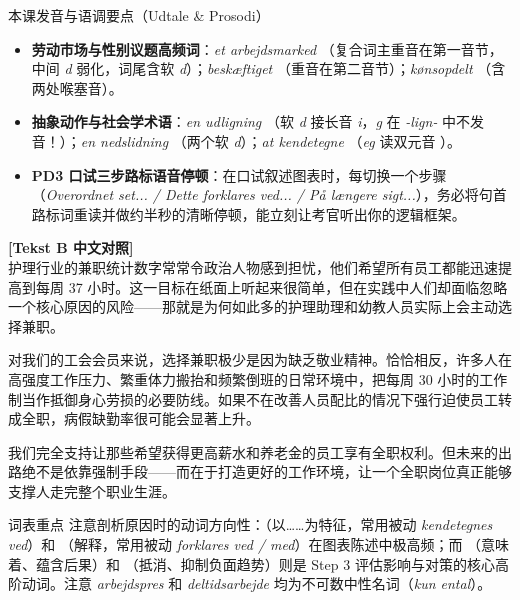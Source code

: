 \begin{tipbox}{本课发音与语调要点（Udtale \& Prosodi）}
\begin{itemize}
  \item \textbf{劳动市场与性别议题高频词}：\textit{et arbejdsmarked} （复合词主重音在第一音节，中间 \textit{d} 弱化，词尾含软 \textit{d}）；\textit{beskæftiget} （重音在第二音节）；\textit{kønsopdelt} （含两处喉塞音）。
  \item \textbf{抽象动作与社会学术语}：\textit{en udligning} （软 \textit{d} 接长音 \textit{i}，\textit{g} 在 \textit{-lign-} 中不发音！）；\textit{en nedslidning} （两个软 \textit{d}）；\textit{at kendetegne} （\textit{eg} 读双元音 ）。
  \item \textbf{PD3 口试三步路标语音停顿}：在口试叙述图表时，每切换一个步骤（\textit{Overordnet set... / Dette forklares ved... / På længere sigt...}），务必将句首路标词重读并做约半秒的清晰停顿，能立刻让考官听出你的逻辑框架。
\end{itemize}
\end{tipbox}

\begin{transbox}
\small
\textbf{\color{NCDTeal}[Tekst B 中文对照]}\\
护理行业的兼职统计数字常常令政治人物感到担忧，他们希望所有员工都能迅速提高到每周 37 小时。这一目标在纸面上听起来很简单，但在实践中人们却面临忽略一个核心原因的风险——那就是为何如此多的护理助理和幼教人员实际上会主动选择兼职。

对我们的工会会员来说，选择兼职极少是因为缺乏敬业精神。恰恰相反，许多人在高强度工作压力、繁重体力搬抬和频繁倒班的日常环境中，把每周 30 小时的工作制当作抵御身心劳损的必要防线。如果不在改善人员配比的情况下强行迫使员工转成全职，病假缺勤率很可能会显著上升。

我们完全支持让那些希望获得更高薪水和养老金的员工享有全职权利。但未来的出路绝不是依靠强制手段——而在于打造更好的工作环境，让一个全职岗位真正能够支撑人走完整个职业生涯。
\end{transbox}


\begin{tipbox}{词表重点}
注意剖析原因时的动词方向性：（以……为特征，常用被动 \textit{kendetegnes ved}）和 （解释，常用被动 \textit{forklares ved / med}）在图表陈述中极高频；而 （意味着、蕴含后果）和 （抵消、抑制负面趋势）则是 Step 3 评估影响与对策的核心高阶动词。注意 \textit{arbejdspres} 和 \textit{deltidsarbejde} 均为不可数中性名词（\textit{kun ental}）。
\end{tipbox}

